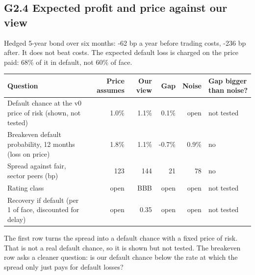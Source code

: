 \documentclass[11pt,a4paper]{article}
\begin{document}
\subsection*{G2.4 Expected profit and price against our view}
Hedged 5-year bond over six months: -62 bp a year before trading costs, -236 bp after. It does not beat costs. The expected default loss is charged on the price paid: 68\% of it in default, not 60\% of face.
\begin{center}\footnotesize\setlength{\tabcolsep}{3.5pt}\begin{tabular}{@{}p{5.2cm}rrrrl@{}}\toprule
Question & Price assumes & Our view & Gap & Noise & Gap bigger than noise? \\\midrule
Default chance at the v0 price of risk (shown, not tested) & 1.0\% & 1.1\% & 0.1\% & open & not tested \\
Breakeven default probability, 12 months (loss on price) & 1.8\% & 1.1\% & -0.7\% & 0.9\% & no \\
Spread against fair, sector peers (bp) & 123 & 144 & 21 & 78 & no \\
Rating class & open & BBB & open & open & not tested \\
Recovery if default (per 1 of face, discounted for delay) & open & 0.35 & open & open & not tested \\
\bottomrule\end{tabular}\end{center}
The first row turns the spread into a default chance with a fixed price of risk. That is not a real default chance, so it is shown but not tested. The breakeven row asks a cleaner question: is our default chance below the rate at which the spread only just pays for default losses?
\end{document}
